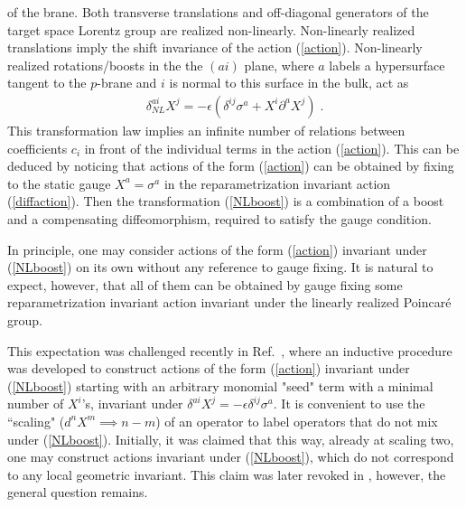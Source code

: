 \documentclass[%
 reprint,
 amsmath,amssymb,
 aps,
]{revtex4-1}
\begin{document}
of the brane. Both transverse translations and off-diagonal generators of the target space
Lorentz group are realized non-linearly. Non-linearly realized translations imply the shift invariance of the action (\ref{action}).
 Non-linearly realized rotations/boosts in the
the $(ai)$ plane, where $a$ labels a hypersurface tangent to the $p$-brane and $i$ is normal to
this surface in the bulk, act as
\begin{eqnarray}
\label{NLboost}
    \delta^{a i}_{NL} X^j =- \epsilon (\delta^{ij}
    \sigma^a + X^i \partial^a X^{j}) \; .
\end{eqnarray}
This transformation law implies an infinite number of relations between coefficients $c_i$ in front of the individual terms in the action (\ref{action}).
This can be deduced by  noticing that actions of the form (\ref{action}) can be obtained by fixing to the static gauge $X^a=\sigma^a$
in the reparametrization invariant action (\ref{diffaction}). Then the transformation (\ref{NLboost}) is a combination of a boost and a compensating
diffeomorphism, required to satisfy the gauge condition.

In principle, one may consider actions of the form (\ref{action}) invariant under (\ref{NLboost}) on its own  without any reference to  gauge fixing.
It is natural to expect, however, that all of them can be obtained by gauge fixing some reparametrization invariant action
invariant under the linearly realized Poincar\'e group.

This expectation was challenged recently in Ref.~\cite{Gliozzi:2012cx}, where an inductive procedure was developed
to construct actions of the form (\ref{action}) invariant under (\ref{NLboost}) starting with an arbitrary monomial "seed" term with a minimal number of $X^i$'s, invariant under
$\delta^{ai}X^j=-\epsilon \delta^{ij}  \sigma^a $. It is convenient to use the ``scaling" ($d^n X^m \implies n-m$)
of an operator to label operators that do not mix under (\ref{NLboost}).
Initially, it was claimed that this way, already at scaling two, one may construct actions invariant under   (\ref{NLboost}), which do not correspond
to any local geometric invariant. This claim was later revoked in \cite{Meineri:2013ew}, however, the general question remains.
\end{document}
